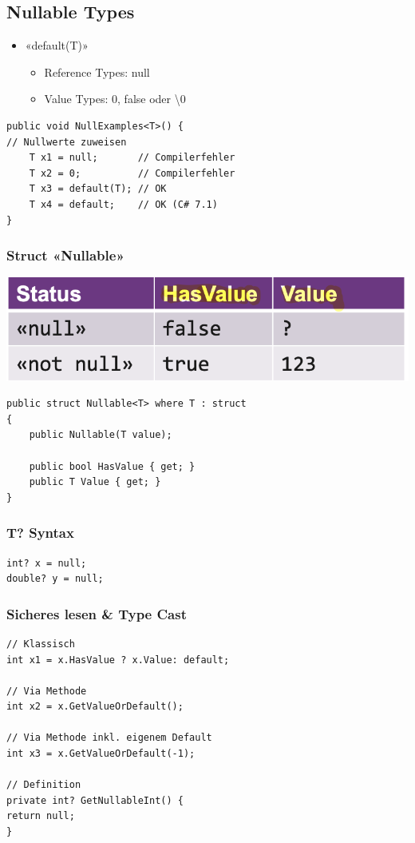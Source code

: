 \subsection{Nullable Types}

\begin{itemize}
    \item «default(T)»
    \begin{itemize}
        \item Reference Types: null
        \item Value Types: 0, false oder \textbackslash0
    \end{itemize}
\end{itemize}

\begin{lstlisting}
public void NullExamples<T>() {
// Nullwerte zuweisen 
    T x1 = null;       // Compilerfehler
    T x2 = 0;          // Compilerfehler 
    T x3 = default(T); // OK
    T x4 = default;    // OK (C# 7.1)
}
\end{lstlisting}

\subsubsection{Struct «Nullable»}
\begin{center}
    \includegraphics[scale=.3]{graphic/generics/Struct Nullable.png}
\end{center}
\begin{lstlisting}
public struct Nullable<T> where T : struct
{
    public Nullable(T value);

    public bool HasValue { get; }
    public T Value { get; }
}
\end{lstlisting}

\subsubsection{T? Syntax}
\begin{lstlisting}
int? x = null; 
double? y = null;
\end{lstlisting}


\subsubsection{Sicheres lesen \& Type Cast}
\begin{lstlisting}
// Klassisch
int x1 = x.HasValue ? x.Value: default;

// Via Methode
int x2 = x.GetValueOrDefault();

// Via Methode inkl. eigenem Default
int x3 = x.GetValueOrDefault(-1);

// Definition
private int? GetNullableInt() {
return null;
}
\end{lstlisting}


